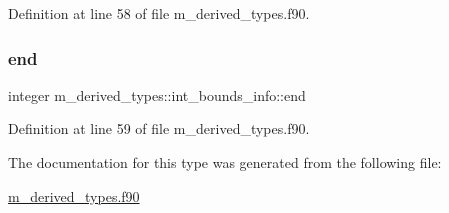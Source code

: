 Definition at line 58 of file m\+\_\+derived\+\_\+types.\+f90.

\mbox{\label{structm__derived__types_1_1int__bounds__info_aaf13834e181a2f6618008592ae58df70}} 
\subsubsection{\texorpdfstring{end}{end}}
{\footnotesize\ttfamily integer m\+\_\+derived\+\_\+types\+::int\+\_\+bounds\+\_\+info\+::end}



Definition at line 59 of file m\+\_\+derived\+\_\+types.\+f90.



The documentation for this type was generated from the following file\+:\begin{DoxyCompactItemize}
\item 
\hyperlink{m__derived__types_8f90}{m\+\_\+derived\+\_\+types.\+f90}\end{DoxyCompactItemize}
